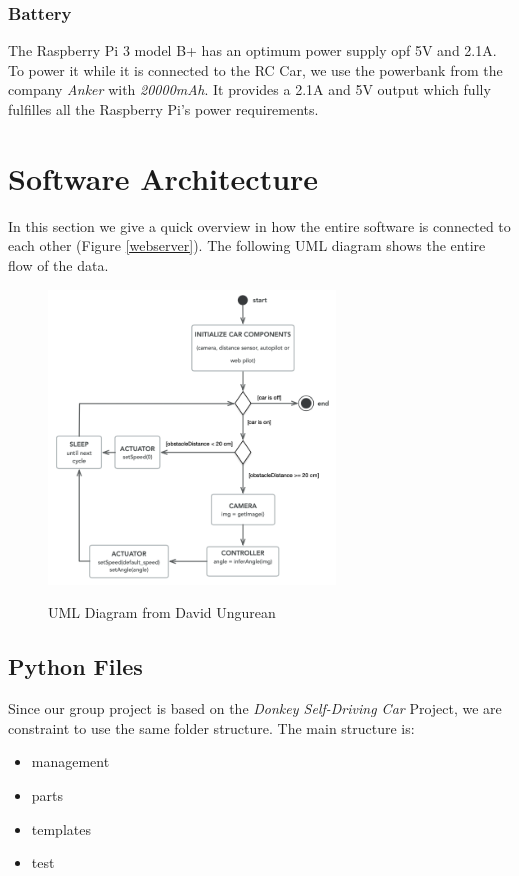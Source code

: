 \documentclass[journal]{IEEEtran}
\begin{document}
\subsubsection{Battery}
The Raspberry Pi 3 model B+ has an optimum power supply opf 5V and 2.1A. To power it while it is connected to the RC Car, we use the powerbank from the company \textit{Anker} with \textit{20000mAh}. It provides a 2.1A and 5V output which fully fulfilles all the Raspberry Pi's power requirements.

\section{Software Architecture}

In this section we give a quick overview in how the entire software is connected to each other (Figure \ref{webserver}). The following UML diagram shows the entire flow of the data.

\begin{figure}
  \begin{center}
  \includegraphics[width=3in]{photo/uml}\\
  \caption{UML Diagram from David Ungurean \cite{master}}\label{uml}
  \end{center}
\end{figure}

\subsection{Python Files}

Since our group project is based on the \textit{Donkey Self-Driving Car} \cite{donkey} Project,  we are constraint to use the same folder structure. The main structure is:

\begin{itemize}
\item management
\item parts
\item templates
\item test
\end{itemize}
\end{document}
